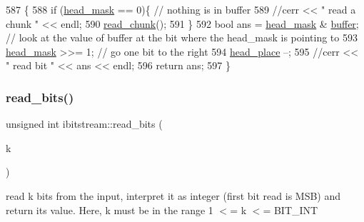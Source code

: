 \begin{DoxyCode}
587                          \{
588   \textcolor{keywordflow}{if} (\hyperlink{classibitstream_a48cd41991b6c29ea5120b53873a72a70}{head\_mask} == 0)\{ \textcolor{comment}{// nothing is in buffer}
589     \textcolor{comment}{//cerr << " read a chunk " << endl;}
590     \hyperlink{classibitstream_ac62c26004436d83f337f4aeba0895e20}{read\_chunk}();
591   \}
592   \textcolor{keywordtype}{bool} ans = \hyperlink{classibitstream_a48cd41991b6c29ea5120b53873a72a70}{head\_mask} & \hyperlink{classibitstream_a73f0b24d3d4402369f1abbb43f7f70ef}{buffer}; \textcolor{comment}{// look at the value of buffer at the bit where the
       head\_mask is pointing to}
593   \hyperlink{classibitstream_a48cd41991b6c29ea5120b53873a72a70}{head\_mask} >>= 1; \textcolor{comment}{// go one bit to the right}
594   \hyperlink{classibitstream_a7b96359ac1534a5565e6e9b0cc53a0b3}{head\_place} --;
595   \textcolor{comment}{//cerr << " read bit " << ans << endl;}
596   \textcolor{keywordflow}{return} ans;
597 \}
\end{DoxyCode}
\mbox{\label{classibitstream_a2fdcaecf10fefa6942dcd5286a2696e0}} 
\subsubsection{\texorpdfstring{read\+\_\+bits()}{read\_bits()}\hspace{0.1cm}{\footnotesize\ttfamily [1/2]}}
{\footnotesize\ttfamily unsigned int ibitstream\+::read\+\_\+bits (\begin{DoxyParamCaption}\item[{unsigned int}]{k }\end{DoxyParamCaption})}



read k bits from the input, interpret it as integer (first bit read is M\+SB) and return its value. Here, k must be in the range 1 $<$= k $<$= B\+I\+T\+\_\+\+I\+NT 


